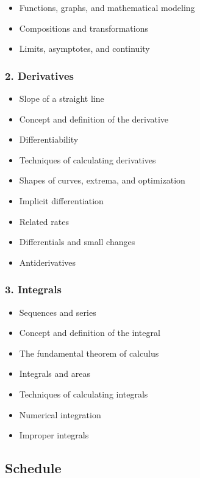 \documentclass[
]{article}
\begin{document}
\begin{itemize}
\item
  Functions, graphs, and mathematical modeling
\item
  Compositions and transformations
\item
  Limits, asymptotes, and continuity
\end{itemize}

\hypertarget{derivatives}{%
\subsubsection*{2. Derivatives}\label{derivatives}}

\begin{itemize}
\item
  Slope of a straight line
\item
  Concept and definition of the derivative
\item
  Differentiability
\item
  Techniques of calculating derivatives
\item
  Shapes of curves, extrema, and optimization
\item
  Implicit differentiation
\item
  Related rates
\item
  Differentials and small changes
\item
  Antiderivatives
\end{itemize}

\hypertarget{integrals}{%
\subsubsection*{3. Integrals}\label{integrals}}

\begin{itemize}
\item
  Sequences and series
\item
  Concept and definition of the integral
\item
  The fundamental theorem of calculus
\item
  Integrals and areas
\item
  Techniques of calculating integrals
\item
  Numerical integration
\item
  Improper integrals
\end{itemize}

\hypertarget{schedule}{%
\subsection*{Schedule}\label{schedule}}
\end{document}
